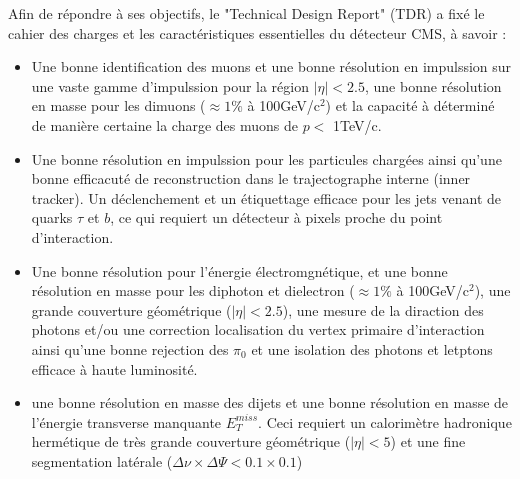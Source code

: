 Afin de répondre à ses objectifs, le "Technical Design Report" (TDR) \cite{Bayatian:922757} a fixé le cahier des charges et les caractéristiques essentielles du détecteur CMS, à savoir :
\begin{itemize}[label=$\bullet$]
	\item Une bonne identification des muons et une bonne résolution en impulssion sur une vaste gamme d'impulssion pour la région $|\eta|<2.5$, une bonne résolution en masse pour les dimuons ($\approx 1\%$ à 100GeV/c$^{2}$) et la capacité à déterminé de manière certaine la charge des muons de $p<$ 1TeV/c.
	\item Une bonne résolution en impulssion pour les particules chargées ainsi qu'une bonne efficacuté de reconstruction dans le trajectographe interne (inner tracker). Un déclenchement et un étiquettage efficace pour les jets venant de quarks $\tau$ et $b$, ce qui requiert un détecteur à pixels proche du point d'interaction.
	\item Une bonne résolution pour l'énergie électromgnétique, et une bonne résolution en masse pour les diphoton et dielectron  ($\approx 1\%$ à 100GeV/c$^{2}$), une grande couverture géométrique ($|\eta|<2.5$), une mesure de la diraction des photons et/ou une correction localisation du vertex primaire d'interaction ainsi qu'une bonne rejection des $\pi_{0}$ et une isolation des photons et letptons efficace à haute luminosité.
	\item une bonne résolution en masse des dijets et une bonne résolution en masse de l'énergie transverse manquante $E_{T}^{miss}$. Ceci requiert un calorimètre hadronique hermétique de très grande couverture géométrique ($|\eta|<5$) et une fine segmentation latérale ($\Delta\nu\times\Delta\Psi<0.1\times0.1$)
\end{itemize} 

